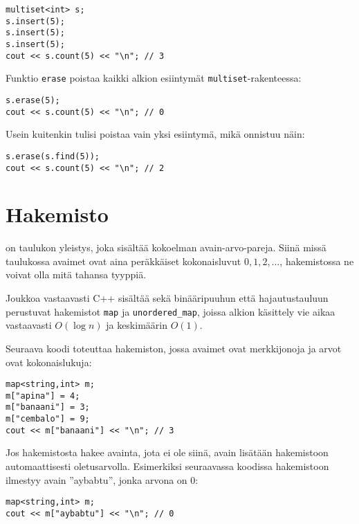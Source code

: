 \begin{lstlisting}
multiset<int> s;
s.insert(5);
s.insert(5);
s.insert(5);
cout << s.count(5) << "\n"; // 3
\end{lstlisting}

Funktio \texttt{erase} poistaa
kaikki alkion esiintymät
\texttt{multiset}-rakenteessa:

\begin{lstlisting}
s.erase(5);
cout << s.count(5) << "\n"; // 0
\end{lstlisting}

Usein kuitenkin tulisi poistaa
vain yksi esiintymä,
mikä onnistuu näin:

\begin{lstlisting}
s.erase(s.find(5));
cout << s.count(5) << "\n"; // 2
\end{lstlisting}

\section{Hakemisto}


 on taulukon yleistys,
joka sisältää kokoelman avain-arvo-pareja.
Siinä missä taulukossa avaimet ovat aina peräkkäiset
kokonaisluvut $0,1,2,\ldots$,
hakemistossa ne voivat
olla mitä tahansa tyyppiä.

Joukkoa vastaavasti C++ sisältää sekä
binääripuuhun että hajautustauluun perustuvat
hakemistot \texttt{map} ja \texttt{unordered\_map},
joissa alkion käsittely vie aikaa vastaavasti
$O(\log n)$ ja keskimäärin $O(1)$.

Seuraava koodi toteuttaa hakemiston,
jossa avaimet ovat merkkijonoja ja
arvot ovat kokonaislukuja:

\begin{lstlisting}
map<string,int> m;
m["apina"] = 4;
m["banaani"] = 3;
m["cembalo"] = 9;
cout << m["banaani"] << "\n"; // 3
\end{lstlisting}

Jos hakemistosta hakee avainta,
jota ei ole siinä,
avain lisätään hakemistoon
automaattisesti oletusarvolla.
Esimerkiksi seuraavassa koodissa
hakemistoon ilmestyy avain ''aybabtu'',
jonka arvona on 0:

\begin{lstlisting}
map<string,int> m;
cout << m["aybabtu"] << "\n"; // 0
\end{lstlisting}

